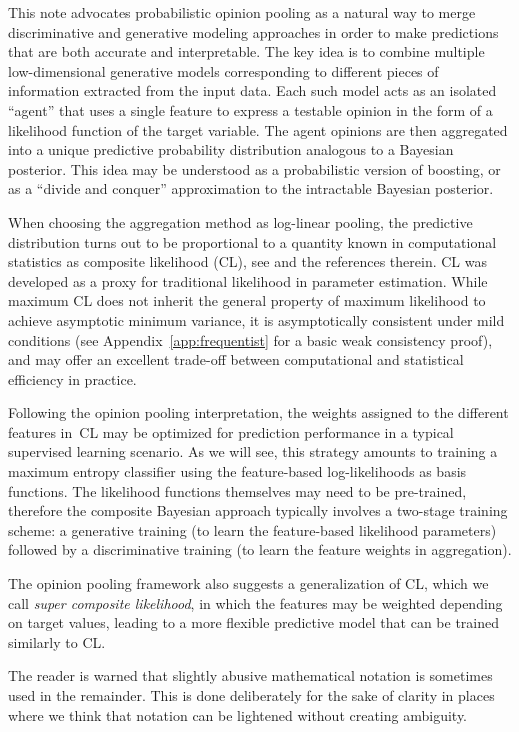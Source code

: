 \documentclass[english]{scrartcl}
\begin{document}
This note advocates probabilistic opinion pooling \cite{Genest-86} as a natural way to merge discriminative and generative modeling approaches in order to make predictions that are both accurate and interpretable. The key idea is to combine multiple low-dimensional generative models corresponding to different pieces of information extracted from the input data. Each such model acts as an isolated ``agent'' that uses a single feature to express a testable opinion in the form of a likelihood function of the target variable. The agent opinions are then aggregated into a unique predictive probability distribution analogous to a Bayesian posterior. This idea may be understood as a probabilistic version of boosting, or as a ``divide and conquer'' approximation to the intractable Bayesian posterior. 

When choosing the aggregation method as log-linear pooling, the predictive distribution turns out to be proportional to a quantity known in computational statistics as composite likelihood (CL), see \cite{Varin-11} and the references therein. CL was developed as a proxy for traditional likelihood in parameter estimation. While maximum CL does not inherit the general property of maximum likelihood to achieve asymptotic minimum variance, it is asymptotically consistent under mild conditions \cite{Xu-11} (see Appendix~\ref{app:frequentist} for a basic weak consistency proof), and may offer an excellent trade-off between computational and statistical efficiency in practice.

Following the opinion pooling interpretation, the weights assigned to the different features in~CL may be optimized for prediction performance in a typical supervised learning scenario. As we will see, this strategy amounts to training a maximum entropy classifier using the feature-based log-likelihoods as basis functions. The likelihood functions themselves may need to be pre-trained, therefore the composite Bayesian approach typically involves a two-stage training scheme: a generative training (to learn the feature-based likelihood parameters) followed by a discriminative training (to learn the feature weights in aggregation).

The opinion pooling framework also suggests a generalization of CL, which we call {\em super composite likelihood}, in which the features may be weighted depending on target values, leading to a more flexible predictive model that can be trained similarly to CL.

The reader is warned that slightly abusive mathematical notation is sometimes used in the remainder. This is done deliberately for the sake of clarity in places where we think that notation can be lightened without creating ambiguity. 
\end{document}
